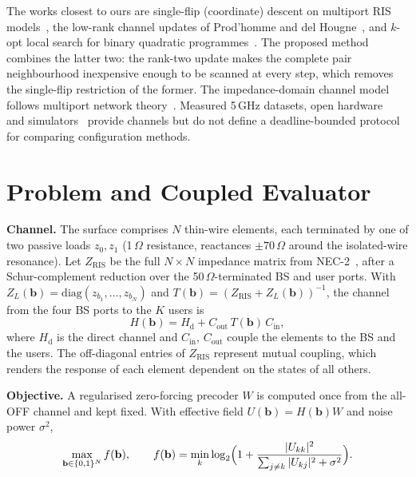 \documentclass[runningheads]{llncs}
\newcommand{\Hd}{H_{\mathrm{d}}}
\begin{document}
The works closest to ours are single-flip (coordinate) descent on multiport RIS models~\cite{hammami2026statistical}, the low-rank channel updates of Prod'homme and del Hougne~\cite{prodhomme2023efficient}, and $k$-opt local search for binary quadratic programmes~\cite{merz2002bqp}. The proposed method combines the latter two: the rank-two update makes the complete pair neighbourhood inexpensive enough to be scanned at every step, which removes the single-flip restriction of the former. The impedance-domain channel model follows multiport network theory~\cite{nerini2024universal,nossek2024physically,abrardo2024design,li2026tutorial}. Measured 5\,GHz datasets, open hardware~\cite{tewes2023comprehensive,rossanese2024open,piana2026brisc,heinrichs2023open} and simulators~\cite{burtakov2023qris} provide channels but do not define a deadline-bounded protocol for comparing configuration methods.

\section{Problem and Coupled Evaluator}\label{sec:problem}
\textbf{Channel.} The surface comprises $N$ thin-wire elements, each terminated by one of two passive loads $z_0,z_1$ (1\,$\Omega$ resistance, reactances $\pm70\,\Omega$ around the isolated-wire resonance). Let $Z_{\mathrm{RIS}}$ be the full $N\times N$ impedance matrix from NEC-2~\cite{burke1981nec,pynec}, after a Schur-complement reduction over the 50\,$\Omega$-terminated BS and user ports. With $Z_L(\mathbf b)=\mathrm{diag}(z_{b_1},\dots,z_{b_N})$ and $T(\mathbf b)=(Z_{\mathrm{RIS}}+Z_L(\mathbf b))^{-1}$, the channel from the four BS ports to the $K$ users is
\begin{equation}
H(\mathbf b)=\Hd + C_{\mathrm{out}}\,T(\mathbf b)\,C_{\mathrm{in}},
\label{eq:operator}
\end{equation}
where $\Hd$ is the direct channel and $C_{\mathrm{in}}$, $C_{\mathrm{out}}$ couple the elements to the BS and the users. The off-diagonal entries of $Z_{\mathrm{RIS}}$ represent mutual coupling, which renders the response of each element dependent on the states of all others.

\textbf{Objective.} A regularised zero-forcing precoder $W$ is computed once from the all-OFF channel and kept fixed. With effective field $U(\mathbf b)=H(\mathbf b)W$ and noise power $\sigma^2$,
\begin{equation}
\max_{\mathbf b\in\{0,1\}^N} f(\mathbf b),\qquad f(\mathbf b)=\min_{k}\log_2\Bigl(1+\frac{|U_{kk}|^2}{\sum_{j\ne k}|U_{kj}|^2+\sigma^2}\Bigr).
\label{eq:objective}
\end{equation}
\end{document}
